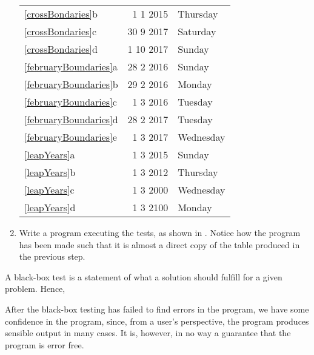 \begin{enumerate}
\begin{center}
\begin{tabular}{|l|r|l|}
    \ref{crossBondaries}b&1 1 2015&Thursday\\
    \ref{crossBondaries}c&30 9 2017&Saturday\\
    \ref{crossBondaries}d&1 10 2017&Sunday\\
    \hline
    \ref{februaryBoundaries}a&28 2 2016&Sunday\\
    \ref{februaryBoundaries}b&29 2 2016&Monday\\
    \ref{februaryBoundaries}c&1 3 2016&Tuesday\\
    \ref{februaryBoundaries}d&28 2 2017&Tuesday\\
    \ref{februaryBoundaries}e&1 3 2017&Wednesday\\
    \hline
    \ref{leapYears}a&1 3 2015&Sunday\\
    \ref{leapYears}b&1 3 2012&Thursday\\
    \ref{leapYears}c&1 3 2000&Wednesday\\
    \ref{leapYears}d&1 3 2100&Monday\\
    \hline
  \end{tabular}
\end{center}
\item Write a program executing the tests, as shown in .
% 
%
%
Notice how the program has been made such that it is almost a direct copy of the table produced in the previous step.
\end{enumerate}
A black-box test is a statement of what a solution should fulfill for a given problem. Hence, 

After the black-box testing has failed to find errors in the program, we have some confidence in the program, since, from a user's perspective, the program produces sensible output in many cases. It is, however, in no way a guarantee that the program is error free.

